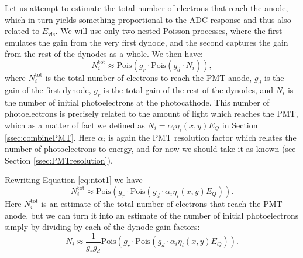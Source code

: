 Let us attempt to estimate the total number of electrons that reach the anode, which in turn yields something
proportional to the ADC response and thus also related to $E_{\mathrm{vis}}$. We will use only two nested Poisson
processes, where the first emulates the gain from the very first dynode, and the second captures the gain from the rest of
the dynodes as a whole. We then have:
%
\begin{equation}
  N_i^{\mathrm{tot}} \approx \mathrm{Pois}(g_r \cdot \mathrm{Pois}(g_d \cdot N_i)),
  \label{eq:ntot1}
\end{equation}
%
where $N_i^{\mathrm{tot}}$ is the total number of electrons to reach the PMT anode, $g_d$ is the gain of the first dynode,
$g_r$ is the total gain of the rest of the dynodes, and $N_i$ is the number of initial photoelectrons at the photocathode.
This number of photoelectrons is precisely related to the amount of light which reaches the PMT, which as a matter of fact
we defined as $N_i = \alpha_i \eta_i(x,y) E_Q$ in Section \ref{ssec:combinePMT}. Here $\alpha_i$ is again the PMT resolution
factor which relates the number of photoelectrons to energy, and for now we should take it as known (see Section
\ref{ssec:PMTresolution}).

Rewriting Equation \ref{eq:ntot1} we have
\begin{equation}
  N_i^{\mathrm{tot}} \approx \mathrm{Pois}(g_r \cdot \mathrm{Pois}(g_d \cdot \alpha_i \eta_i(x,y) E_Q)).
  \label{eq:ntot2}
\end{equation}
Here $N_i^{\mathrm{tot}}$ is an estimate of the total number of electrons that reach the PMT anode, but we can turn it
into an estimate of the number of initial photoelectrons simply by dividing by each of the dynode gain factors:
\begin{equation}
  \overline{N_i} \approx \frac{1}{g_rg_d}\mathrm{Pois}(g_r \cdot \mathrm{Pois}(g_d \cdot \alpha_i \eta_i(x,y) E_Q)).
  \label{eq:ntot3}
\end{equation}

